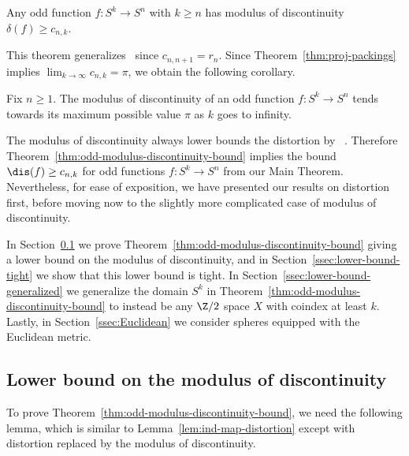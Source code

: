 \documentclass[11pt, reqno, english]{amsart}
\begin{document}
\begin{theorem-odd-modulus-discontinuity-bound}
Any odd function $f\colon S^k \to S^n$ with $k \ge n$ has modulus of discontinuity $\delta(f)\geq c_{n,k}$.
\end{theorem-odd-modulus-discontinuity-bound}

This theorem generalizes~\cite[Corollary~3]{dubins1981equidiscontinuity} since $c_{n,n+1}=r_n$.
Since Theorem~\ref{thm:proj-packings} implies $\lim_{k\to\infty} c_{n,k} = \pi$, we obtain the following corollary.

\begin{corollary}
\label{cor:odd-modulus-discontinuity-limit}
Fix $n\ge 1$.
The modulus of discontinuity of an odd function $f\colon S^k \to S^n$ tends towards its maximum possible value $\pi$ as $k$ goes to infinity.
\end{corollary}

\begin{remark}
The modulus of discontinuity always lower bounds the distortion by ~\cite[Proposition~5.2]{lim2021gromov}.
Therefore Theorem~\ref{thm:odd-modulus-discontinuity-bound} implies the bound 
$\dis(f) \ge c_{n,k}$ for odd functions $f \colon S^k \to S^n$
from our Main Theorem.
Nevertheless, for ease of exposition, we have presented our results on distortion first, before moving now to the slightly more complicated case of modulus of discontinuity.
\end{remark}

In Section~\ref{ssec:lower-bound} we prove Theorem~\ref{thm:odd-modulus-discontinuity-bound} giving a lower bound on the modulus of discontinuity, and in Section~\ref{ssec:lower-bound-tight} we show that this lower bound is tight.
In Section~\ref{ssec:lower-bound-generalized} we generalize the domain $S^{k}$ in Theorem~\ref{thm:odd-modulus-discontinuity-bound} to instead be any $\Z/2$ space $X$ with coindex at least $k$.
Lastly, in Section~\ref{ssec:Euclidean} we consider spheres equipped with the Euclidean metric.


\subsection{Lower bound on the modulus of discontinuity}
\label{ssec:lower-bound}

To prove Theorem~\ref{thm:odd-modulus-discontinuity-bound}, we need the following lemma, which is similar to Lemma~\ref{lem:ind-map-distortion} except with distortion replaced by the modulus of discontinuity.
\end{document}
